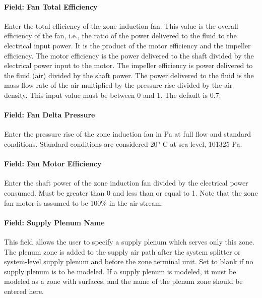 \paragraph{Field: Fan Total Efficiency}\label{field-fan-total-efficiency-001}

Enter the total efficiency of the zone induction fan. This value is the overall efficiency of the fan, i.e., the ratio of the power delivered to the fluid to the electrical input power. It is the product of the motor efficiency and the impeller efficiency. The motor efficiency is the power delivered to the shaft divided by the electrical power input to the motor. The impeller efficiency is power delivered to the fluid (air) divided by the shaft power. The power delivered to the fluid is the mass flow rate of the air multiplied by the pressure rise divided by the air density. This input value must be between 0 and 1. The default is 0.7.

\paragraph{Field: Fan Delta Pressure}\label{field-fan-delta-pressure}

Enter the pressure rise of the zone induction fan in Pa at full flow and standard conditions. Standard conditions are considered 20\(^{o}\) C at sea level, 101325 Pa.

\paragraph{Field: Fan Motor Efficiency}\label{field-fan-motor-efficiency}

Enter the shaft power of the zone induction fan divided by the electrical power consumed. Must be greater than 0 and less than or equal to 1. Note that the zone fan motor is assumed to be 100\% in the air stream.

\paragraph{Field: Supply Plenum Name}\label{field-supply-plenum-name-2}

This field allows the user to specify a supply plenum which serves only this zone. The plenum zone is added to the supply air path after the system splitter or system-level supply plenum and before the zone terminal unit. Set to blank if no supply plenum is to be modeled. If a supply plenum is modeled, it must be modeled as a zone with surfaces, and the name of the plenum zone should be entered here.

